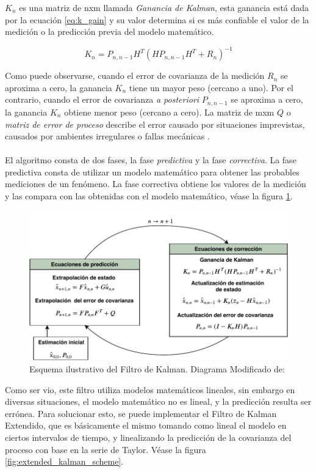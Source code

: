 $K_n$ es una matriz de nxm llamada \textit{Ganancia de Kalman}, esta ganancia está dada por la ecuación \ref{eq:k_gain} y su valor determina si es más confiable el valor de la medición o la predicción previa del modelo matemático.

\begin{equation}
K_n = P_{n,n-1}H^T(HP_{n,n-1}H^T+R_n)^{-1}
\label{eq:k_gain}
\end{equation}

Como puede observarse, cuando el error de covarianza de la medición $R_n$ se aproxima a cero, la ganancia $K_n$  tiene un mayor peso (cercano a uno). Por el contrario, cuando el error de covarianza \textit{a posteriori} $P_{n,n-1}$ se aproxima a cero, la ganancia $K_n$ obtiene menor peso (cercano a cero).
	La matriz de mxm $Q$ o \textit{matriz de error de proceso} describe el error causado por situaciones imprevistas, causados por ambientes irregulares o fallas mecánicas .	
\\
\\
	El algoritmo consta de dos fases, la fase \textit{predictiva} y la fase \textit{correctiva}. La fase predictiva consta de utilizar un modelo matemático para obtener las probables mediciones de un fenómeno. La fase correctiva obtiene los valores de la medición y las compara con las obtenidas con el modelo matemático, véase la figura \ref{fig:Kalman_scheme}.

\begin{figure}
\centering
\includegraphics[scale=0.7]{images/kalman_algorithm.pdf}
\caption{Esquema ilustrativo del Filtro de Kalman. Diagrama Modificado de: \cite{welch1995introduction}}
\label{fig:Kalman_scheme}
\end{figure}

	Como ser vio, este filtro utiliza modelos matemáticos lineales, sin embargo en diversas situaciones, el modelo matemático no es lineal, y la predicción resulta ser errónea. Para solucionar esto, se puede implementar el Filtro de Kalman Extendido, que es básicamente el mismo tomando como lineal el modelo en ciertos intervalos de tiempo, y linealizando la predicción de la covarianza del proceso con base en la serie de Taylor. Véase la figura \ref{fig:extended_kalman_scheme}.

